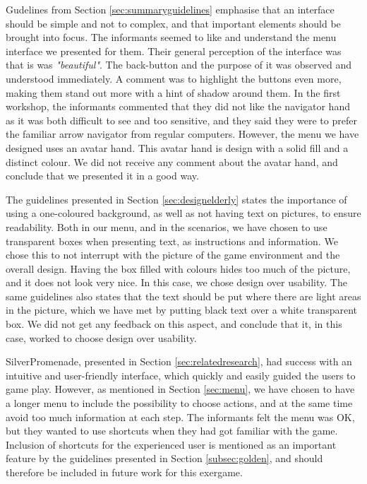 Gudelines from Section \ref{sec:summaryguidelines} emphasise that an interface should be simple and not to complex, and that important elements should be brought into focus. The informants seemed to like and understand the menu interface we presented for them. Their general perception of the interface was that is was \emph{"beautiful"}. The back-button and the purpose of it was observed and understood immediately. A comment was to highlight the buttons even more, making them stand out more with a hint of shadow around them. In the first workshop, the informants commented that they did not like the navigator hand as it was both difficult to see and too sensitive, and they said they were to prefer the familiar arrow navigator from regular computers. However, the menu we have designed uses an avatar hand. This avatar hand is design with a solid fill and a distinct colour. We did not receive any comment about the avatar hand, and conclude that we presented it in a good way.

The guidelines presented in Section \ref{sec:designelderly} states the importance of using a one-coloured background, as well as not having text on pictures, to ensure readability. Both in our menu, and in the scenarios, we have chosen to use transparent boxes when presenting text, as instructions and information. We chose this to not interrupt with the picture of the game environment and the overall design. Having the box filled with colours hides too much of the picture, and it does not look very nice. In this case, we chose design over usability. The same guidelines also states that the text should be put where there are light areas in the picture, which we have met by putting black text over a white transparent box. We did not get any feedback on this aspect, and conclude that it, in this case, worked to choose design over usability.    

SilverPromenade, presented in Section \ref{sec:relatedresearch}, had success with an intuitive and user-friendly interface, which quickly and easily guided the users to game play. However, as mentioned in Section \ref{sec:menu}, we have chosen to have a longer menu to include the possibility to choose actions, and at the same time avoid too much information at each step. The informants felt the menu was OK, but they wanted to use shortcuts when they had got familiar with the game. Inclusion of shortcuts for the experienced user is mentioned as an important feature by the guidelines presented in Section \ref{subsec:golden}, and should therefore be included in future work for this exergame.

